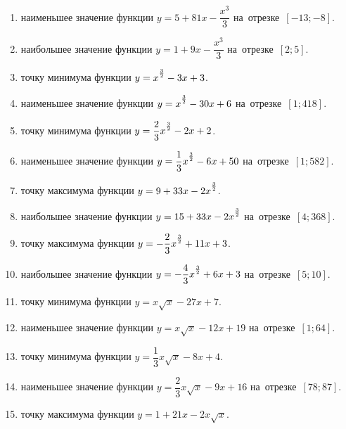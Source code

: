 \documentclass[a4paper,10pt]{article}
\begin{document}
\begin{enumerate}
\item {} наименьшее значение функции $y=5 +81x-\dfrac{x^3}{3}$ на~отрезке~$\left[-13;-8\right]$.

\item {} наибольшее значение функции $y=1 +9x-\dfrac{x^3}{3}$ на~отрезке~$\left[2;5\right]$.

\item {} точку минимума функции $y=x\strut^{\frac{3}{2}} -3x+3$.

\item {} наименьшее значение функции $y=x\strut^{\frac{3}{2}} -30x+6$ на~отрезке~$\left[1;418\right]$.

\item {} точку минимума функции $y=\dfrac{2}{3}x\strut^{\frac{3}{2}} -2x+2$.

\item {} наименьшее значение функции $y=\dfrac{1}{3}x\strut^{\frac{3}{2}} -6x+50$ на~отрезке~$\left[1;582\right]$.

\item {} точку максимума функции $y=9+33x-2x\strut^{\frac{3}{2}}$.

\item {} наибольшее значение функции $y=15+33x-2x\strut^{\frac{3}{2}}$ на~отрезке~$\left[4;368\right]$.

\item {} точку максимума функции $y=-\dfrac{2}{3}x\strut^{\frac{3}{2}} +11x+3$.

\item {} наибольшее значение функции $y=-\dfrac{4}{3}x\strut^{\frac{3}{2}} +6x+3$ на~отрезке~$\left[5;10\right]$.

\item {} точку минимума функции $y=x\sqrt{x} -27x+7$.

\item {} наименьшее значение функции $y=x\sqrt{x} -12x+19$ на~отрезке~$\left[1;64\right]$.

\item {} точку минимума функции $y=\dfrac{1}{3}x\sqrt{x} -8x+4$.

\item {} наименьшее значение функции $y=\dfrac{2}{3}x\sqrt{x} -9x+16$ на~отрезке~$\left[78;87\right]$.

\item {} точку максимума функции $y=1+21x -2x\sqrt{x}$.


\end{enumerate}
\end{document}
